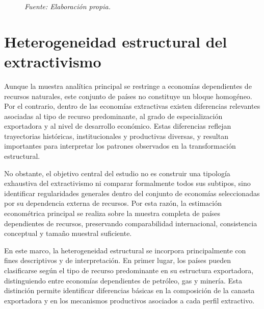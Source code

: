\documentclass[../../PTFM.tex]{subfiles}
\begin{document}
\begin{figure}[htbp]

		\caption[Selección de la muestra]{Procedimiento de selección de países utilizado para construir las muestras analíticas del estudio. La muestra de referencia aplica $\theta=40\%$ sobre la dependencia externa de recursos, medida mediante $DRES$, mientras que los umbrales de 50\% y 60\% se utilizan como definiciones progresivamente más estrictas.}

		\label{fig:sample_selection_pipeline}
		\caption*{\footnotesize \textit{Fuente: Elaboración propia.}}

	\end{figure}

	\section{Heterogeneidad estructural del extractivismo}
	\label{sec:heterogeneidad-estructural}

	Aunque la muestra analítica principal se restringe a economías
	dependientes de recursos naturales, este conjunto de países no constituye
	un bloque homogéneo. Por el contrario, dentro de las economías
	extractivas existen diferencias relevantes asociadas al tipo de recurso
	predominante, al grado de especialización exportadora y al nivel de
	desarrollo económico. Estas diferencias reflejan trayectorias históricas,
	institucionales y productivas diversas, y resultan importantes para
	interpretar los patrones observados en la transformación estructural.

	No obstante, el objetivo central del estudio no es construir una tipología
	exhaustiva del extractivismo ni comparar formalmente todos sus subtipos,
	sino identificar regularidades generales dentro del conjunto de economías
	seleccionadas por su dependencia externa de recursos. Por esta razón, la
	estimación econométrica principal se realiza sobre la muestra completa de
	países dependientes de recursos, preservando comparabilidad
	internacional, consistencia conceptual y tamaño muestral suficiente.

	En este marco, la heterogeneidad estructural se incorpora principalmente
	con fines descriptivos y de interpretación. En primer lugar, los países
	pueden clasificarse según el tipo de recurso predominante en su estructura
	exportadora, distinguiendo entre economías dependientes de petróleo, gas y
	minería. Esta distinción permite
	identificar diferencias básicas en la composición de la canasta
	exportadora y en los mecanismos productivos asociados a cada perfil
	extractivo.
\end{document}
